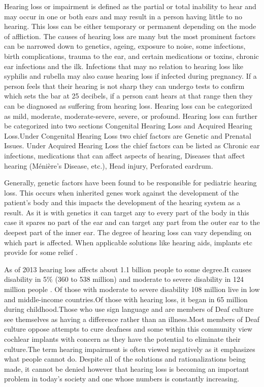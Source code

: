 \documentclass[sigconf]{acmart}
\begin{document}
Hearing loss or impairment is defined as the partial or total inability to hear and may occur in one or both ears and may result in a person having little to no hearing. This loss can be either temporary or permanent depending on the mode of affliction. The causes of hearing loss are many but the most prominent factors can be narrowed down to genetics, ageing, exposure to noise, some infections, birth complications, trauma to the ear, and certain medications or toxins, chronic ear infections and the ilk. Infections that may no relation to hearing loss like syphilis and rubella may also cause hearing loss if infected during pregnancy. If a person feels that their hearing is not sharp they can undergo tests to confirm which sets the bar at 25 decibels, if a person cant hears at that range then they can be diagnosed as suffering from hearing loss. Hearing loss can be categorized as mild, moderate, moderate-severe, severe, or profound\cite{Wikipedia2017}. Hearing loss can further be categorized into two sections Congenital Hearing Loss and Acquired Hearing Loss.Under Congenital Hearing Loss two chief factors are Genetic and Prenatal Issues. Under Acquired Hearing Loss the chief factors can be listed as Chronic ear infections, medications that can affect aspects of hearing, Diseases that affect hearing (Ménière's Disease, etc.), Head injury, Perforated eardrum\cite{Academy2017}.

Generally, genetic factors have been found to be responsible for pediatric hearing loss. This occurs when inherited genes work against the development of the patient's body and this impacts the development of the hearing system as a result. As it is with genetics it can target any to every part of the body in this case it spares no part of the ear and can target any part from the outer ear to the deepest part of the inner ear. The degree of hearing loss can vary depending on which part is affected. When applicable solutions like hearing aids, implants etc provide for some relief \cite{Wikipedia2017}.

As of 2013 hearing loss affects about 1.1 billion people to some degree\cite{Wikipedia2017}.It causes disability in 5\% (360 to 538 million) and moderate to severe disability in 124 million people \cite{Wikipedia2017} . Of those with moderate to severe disability 108 million live in low and middle-income countries.Of those with hearing loss, it began in 65 million during childhood.Those who use sign language and are members of Deaf culture see themselves as having a difference rather than an illness.Most members of Deaf culture oppose attempts to cure deafness and some within this community view cochlear implants with concern as they have the potential to eliminate their culture.The term hearing impairment is often viewed negatively as it emphasizes what people cannot do. Despite all of the solutions and rationalizations being made, it cannot be denied however that hearing loss is becoming an important problem in today's society and one whose numbers is constantly increasing\cite{Wikipedia2017}.
\end{document}
